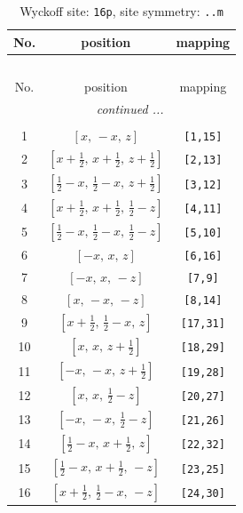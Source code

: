 \documentclass[fleqn,8pt]{jsarticle}
\begin{document}
\renewcommand{\arraystretch}{1.2}
\begin{longtable}{ccc}
\caption{Wyckoff site: {\tt 16p}, site symmetry: {\tt ..m}}
 \\
 \hline \hline
No. & position & mapping \\ \hline \endfirsthead

\multicolumn{2}{l}{\tablename\ \thetable{}} \\
 \hline \hline
No. & position & mapping \\ \hline \endhead

 \hline \hline
\multicolumn{2}{r}{\footnotesize\it continued ...} \\ \endfoot

 \hline \hline
\multicolumn{2}{r}{} \\ \endlastfoot

1 & $\left[ x,\, - x,\, z \right]$ & {\tt [1,15]} \\ \hline
2 & $\left[ x + \frac{1}{2},\, x + \frac{1}{2},\, z + \frac{1}{2} \right]$ & {\tt [2,13]} \\ \hline
3 & $\left[ \frac{1}{2} - x,\, \frac{1}{2} - x,\, z + \frac{1}{2} \right]$ & {\tt [3,12]} \\ \hline
4 & $\left[ x + \frac{1}{2},\, x + \frac{1}{2},\, \frac{1}{2} - z \right]$ & {\tt [4,11]} \\ \hline
5 & $\left[ \frac{1}{2} - x,\, \frac{1}{2} - x,\, \frac{1}{2} - z \right]$ & {\tt [5,10]} \\ \hline
6 & $\left[ - x,\, x,\, z \right]$ & {\tt [6,16]} \\ \hline
7 & $\left[ - x,\, x,\, - z \right]$ & {\tt [7,9]} \\ \hline
8 & $\left[ x,\, - x,\, - z \right]$ & {\tt [8,14]} \\ \hline
9 & $\left[ x + \frac{1}{2},\, \frac{1}{2} - x,\, z \right]$ & {\tt [17,31]} \\ \hline
10 & $\left[ x,\, x,\, z + \frac{1}{2} \right]$ & {\tt [18,29]} \\ \hline
11 & $\left[ - x,\, - x,\, z + \frac{1}{2} \right]$ & {\tt [19,28]} \\ \hline
12 & $\left[ x,\, x,\, \frac{1}{2} - z \right]$ & {\tt [20,27]} \\ \hline
13 & $\left[ - x,\, - x,\, \frac{1}{2} - z \right]$ & {\tt [21,26]} \\ \hline
14 & $\left[ \frac{1}{2} - x,\, x + \frac{1}{2},\, z \right]$ & {\tt [22,32]} \\ \hline
15 & $\left[ \frac{1}{2} - x,\, x + \frac{1}{2},\, - z \right]$ & {\tt [23,25]} \\ \hline
16 & $\left[ x + \frac{1}{2},\, \frac{1}{2} - x,\, - z \right]$ & {\tt [24,30]} \\
\end{longtable}
\end{document}

